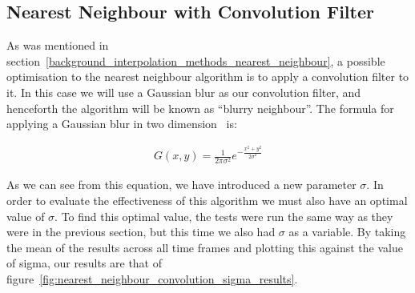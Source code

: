		\subsection{Nearest Neighbour with Convolution Filter}\label{prediction_evaluation_results_nearest_neighbour_convolution_filter}


			As was mentioned in section~\ref{background_interpolation_methods_nearest_neighbour}, a possible optimisation to the nearest neighbour algorithm is to apply a convolution filter to it. In this case we will use a Gaussian blur as our convolution filter, and henceforth the algorithm will be known as ``blurry neighbour''. The formula for applying a Gaussian blur in two dimension~\cite{gaussianblur} is:

			\begin{align*}
				G(x,y) = \frac{1}{2\pi\sigma^{2}} e^{-\frac{x^{2} + y^{2}}{2\sigma^{2}}}
			\end{align*}

			As we can see from this equation, we have introduced a new parameter $\sigma$. In order to evaluate the effectiveness of this algorithm we must also have an optimal value of $\sigma$. To find this optimal value, the tests were run the same way as they were in the previous section, but this time we also had $\sigma$ as a variable. By taking the mean of the results across all time frames and plotting this against the value of sigma, our results are that of figure~\ref{fig:nearest_neighbour_convolution_sigma_results}. 

